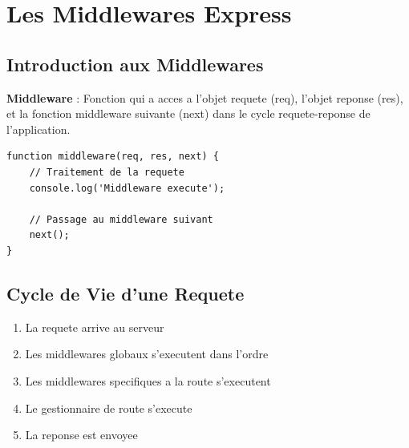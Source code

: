 \documentclass[a4paper,12pt]{book}
\begin{document}
\chapter{Les Middlewares Express}

\section{Introduction aux Middlewares}

\begin{definitionbox}
    \textbf{Middleware} : Fonction qui a acces a l'objet requete (req), l'objet reponse (res), et la fonction middleware suivante (next) dans le cycle requete-reponse de l'application.
\end{definitionbox}

\begin{lstlisting}[style=javascript]
function middleware(req, res, next) {
    // Traitement de la requete
    console.log('Middleware execute');

    // Passage au middleware suivant
    next();
}
\end{lstlisting}

\section{Cycle de Vie d'une Requete}

\begin{enumerate}
    \item La requete arrive au serveur
    \item Les middlewares globaux s'executent dans l'ordre
    \item Les middlewares specifiques a la route s'executent
    \item Le gestionnaire de route s'execute
    \item La reponse est envoyee
\end{enumerate}

\begin{center}
\end{center}
\end{document}
